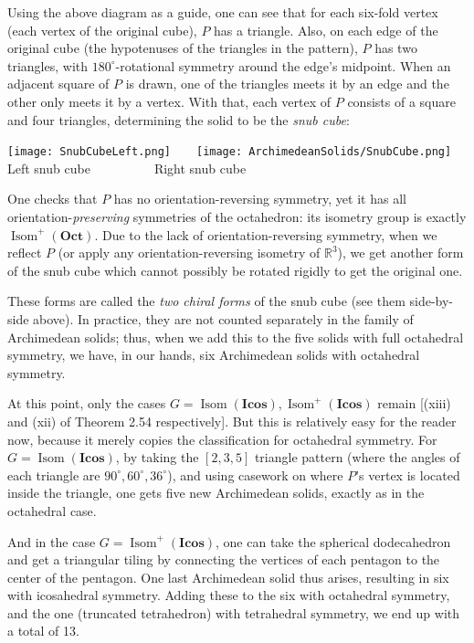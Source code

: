 \documentclass[leqno]{book}
\begin{document}
Using the above diagram as a guide, one can see that for each six-fold vertex (each vertex of the original cube), $P$ has a triangle.  Also, on each edge of the original cube (the hypotenuses of the triangles in the pattern), $P$ has two triangles, with $180^\circ$-rotational symmetry around the edge's midpoint.  When an adjacent square of $P$ is drawn, one of the triangles meets it by an edge and the other only meets it by a vertex.  With that, each vertex of $P$ consists of a square and four triangles, determining the solid to be the \emph{snub cube}:
\begin{center}
\texttt{[image: SnubCubeLeft.png]}~~~~\texttt{[image: ArchimedeanSolids/SnubCube.png]}\\
Left snub cube~~~~~~~~~~Right snub cube
\end{center}
One checks that $P$ has no orientation-reversing symmetry, yet it has all orientation-\emph{preserving} symmetries of the octahedron: its isometry group is exactly $\operatorname{Isom}^+(\mathbf{Oct})$.  Due to the lack of orientation-reversing symmetry, when we reflect $P$ (or apply any orientation-reversing isometry of $\mathbb R^3$), we get another form of the snub cube which cannot possibly be rotated rigidly to get the original one.

These forms are called the \emph{two chiral forms} of the snub cube (see them side-by-side above).  In practice, they are not counted separately in the family of Archimedean solids; thus, when we add this to the five solids with full octahedral symmetry, we have, in our hands, six Archimedean solids with octahedral symmetry.

At this point, only the cases $G=\operatorname{Isom}(\mathbf{Icos}),\operatorname{Isom}^+(\mathbf{Icos})$ remain [(xiii) and (xii) of Theorem 2.54 respectively].  But this is relatively easy for the reader now, because it merely copies the classification for octahedral symmetry.  For $G=\operatorname{Isom}(\mathbf{Icos})$, by taking the $[2,3,5]$ triangle pattern (where the angles of each triangle are $90^\circ,60^\circ,36^\circ$), and using casework on where $P$'s vertex is located inside the triangle, one gets five new Archimedean solids, exactly as in the octahedral case.

And in the case $G=\operatorname{Isom}^+(\mathbf{Icos})$, one can take the spherical dodecahedron and get a triangular tiling by connecting the vertices of each pentagon to the center of the pentagon.  One last Archimedean solid thus arises, resulting in six with icosahedral symmetry.  Adding these to the six with octahedral symmetry, and the one (truncated tetrahedron) with tetrahedral symmetry, we end up with a total of 13.
\end{document}
